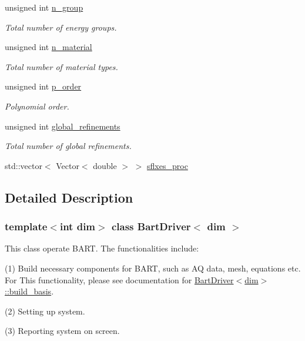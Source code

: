\begin{DoxyCompactItemize}
unsigned int \hyperlink{class_bart_driver_aeb5a04392c80b32379b02e18acbc1126}{n\+\_\+group}
\begin{DoxyCompactList}\small\item\em Total number of energy groups. \end{DoxyCompactList}\item 
unsigned int \hyperlink{class_bart_driver_ae6c9141662b95c89b674ccdc04e9233f}{n\+\_\+material}
\begin{DoxyCompactList}\small\item\em Total number of material types. \end{DoxyCompactList}\item 
unsigned int \hyperlink{class_bart_driver_ae6d782d30c28d741bb0df46251087809}{p\+\_\+order}
\begin{DoxyCompactList}\small\item\em Polynomial order. \end{DoxyCompactList}\item 
unsigned int \hyperlink{class_bart_driver_a1ddb881c78ef92c59f2c686b320c970e}{global\+\_\+refinements}
\begin{DoxyCompactList}\small\item\em Total number of global refinements. \end{DoxyCompactList}\item 
std\+::vector$<$ Vector$<$ double $>$ $>$ \hyperlink{class_bart_driver_a560ae94f3801fb64a35fdbcd0d8a772d}{sflxes\+\_\+proc}
\end{DoxyCompactItemize}


\subsection{Detailed Description}
\subsubsection*{template$<$int dim$>$\newline
class Bart\+Driver$<$ dim $>$}

This class operate B\+A\+RT. The functionalities include\+:

(1) Build necessary components for B\+A\+RT, such as AQ data, mesh, equations etc. For This functionality, please see documentation for \hyperlink{class_bart_driver_ade375a4999de1e775434e11d4e6dd935}{Bart\+Driver$<$dim$>$\+::build\+\_\+basis}.

(2) Setting up system.

(3) Reporting system on screen.

